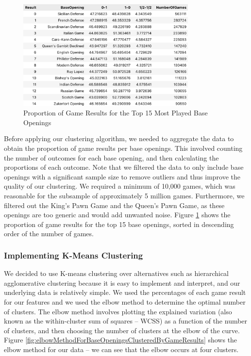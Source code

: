 \documentclass[a4paper, 11pt]{article}
\begin{document}
\begin{figure}[H]
    \centering
    \caption{Proportion of Game Results for the Top 15 Most Played Base Openings}
    \label{fig:proportionOfGameResultsForTop15BaseOpenings}
    \includegraphics[width=0.8\textwidth]{Proportion of Game Results for Top 15 Base Openings.png}
\end{figure}

Before applying our clustering algorithm, we needed to aggregate the data to obtain the proportion of game results per base openings. This involved counting the number of outcomes for each base opening, and then calculating the proportions of each outcome. Note that we filtered the data to only include base openings with a significant sample size to remove outliers and thus improve the quality of our clustering. We required a minimum of 10,000 games, which was reasonable for the subsample of approximately 5 million games. Furthermore, we filtered out the King's Pawn Game and the Queen's Pawn Game, as these openings are too generic and would add unwanted noise. Figure \ref{fig:proportionOfGameResultsForTop15BaseOpenings} shows the proportion of game results for the top 15 base openings, sorted in descending order of the number of games.

\subsubsection{Implementing K-Means Clustering}
We decided to use K-means clustering over alternatives such as hierarchical agglomerative clustering because it is easy to implement and interpret, and our underlying data is relatively simple. We used the percentages of each game result for our features and we used the elbow method to determine the optimal number of clusters. The elbow method involves plotting the explained variation (also known as the within-cluster sum of squares -- WCSS) as a function of the number of clusters, and then choosing the number of clusters at the elbow of the curve. Figure \ref{fig:elbowMethodForBaseOpeningsClusteredByGameResults} shows the elbow method for our data -- we can see that the elbow occurs at four clusters.
\end{document}
